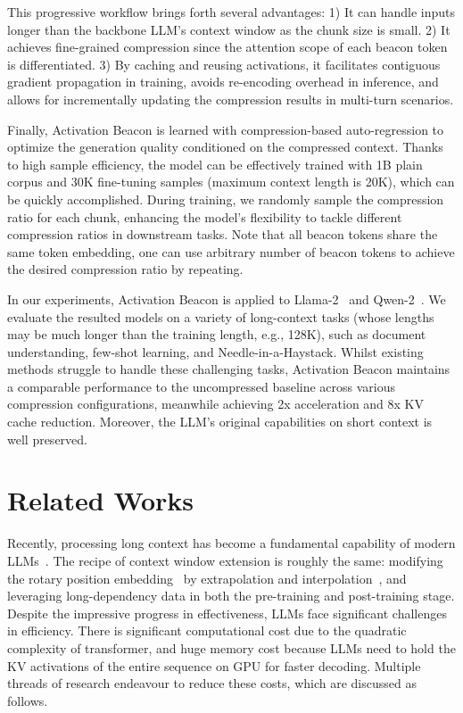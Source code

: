 This progressive workflow brings forth several advantages: 1) It can handle inputs longer than the backbone LLM's context window as the chunk size is small. 2) It achieves fine-grained compression since the attention scope of each beacon token is differentiated. 3) By caching and reusing activations, it facilitates contiguous gradient propagation in training, avoids re-encoding overhead in inference, and allows for incrementally updating the compression results in multi-turn scenarios.

Finally, Activation Beacon is learned with compression-based auto-regression to optimize the generation quality conditioned on the compressed context. Thanks to high sample efficiency, the model can be effectively trained with 1B plain corpus and 30K fine-tuning samples (maximum context length is 20K), which can be quickly accomplished. During training, we randomly sample the compression ratio for each chunk, enhancing the model's flexibility to tackle different compression ratios in downstream tasks. Note that all beacon tokens share the same token embedding, one can use arbitrary number of beacon tokens to achieve the desired compression ratio by repeating. 

In our experiments, Activation Beacon is applied to Llama-2~\citep{touvron2023llama2} and Qwen-2~\citep{qwen2}. We evaluate the resulted models on a variety of long-context tasks (whose lengths may be much longer than the training length, e.g., 128K), such as document understanding, few-shot learning, and Needle-in-a-Haystack. Whilst existing methods struggle to handle these challenging tasks, Activation Beacon maintains a comparable performance to the uncompressed baseline across various compression configurations, meanwhile achieving 2x acceleration and 8x KV cache reduction. Moreover, the LLM's original capabilities on short context is well preserved.

\section{Related Works}

Recently, processing long context has become a fundamental capability of modern LLMs~\citep{gpt4,llama3,qwen2,deepseekai2024deepseekv2}. The recipe of context window extension is roughly the same: modifying the rotary position embedding~\citep{su2021rope} by extrapolation and interpolation~\citep{chen2023pi,ntkaware2023,peng2023yarn,ding2024longrope}, and leveraging long-dependency data in both the pre-training and post-training stage. Despite the impressive progress in effectiveness, LLMs face significant challenges in efficiency. There is significant computational cost due to the quadratic complexity of transformer, and huge memory cost because LLMs need to hold the KV activations of the entire sequence on GPU for faster decoding. Multiple threads of research endeavour to reduce these costs, which are discussed as follows.

